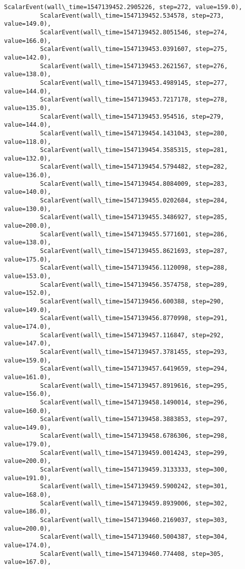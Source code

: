 \documentclass[11pt]{article}
\begin{document}
\begin{Verbatim}[commandchars=\\\{\}]
          ScalarEvent(wall\_time=1547139452.2905226, step=272, value=159.0),
          ScalarEvent(wall\_time=1547139452.534578, step=273, value=149.0),
          ScalarEvent(wall\_time=1547139452.8051546, step=274, value=166.0),
          ScalarEvent(wall\_time=1547139453.0391607, step=275, value=142.0),
          ScalarEvent(wall\_time=1547139453.2621567, step=276, value=138.0),
          ScalarEvent(wall\_time=1547139453.4989145, step=277, value=144.0),
          ScalarEvent(wall\_time=1547139453.7217178, step=278, value=135.0),
          ScalarEvent(wall\_time=1547139453.954516, step=279, value=144.0),
          ScalarEvent(wall\_time=1547139454.1431043, step=280, value=118.0),
          ScalarEvent(wall\_time=1547139454.3585315, step=281, value=132.0),
          ScalarEvent(wall\_time=1547139454.5794482, step=282, value=136.0),
          ScalarEvent(wall\_time=1547139454.8084009, step=283, value=140.0),
          ScalarEvent(wall\_time=1547139455.0202684, step=284, value=130.0),
          ScalarEvent(wall\_time=1547139455.3486927, step=285, value=200.0),
          ScalarEvent(wall\_time=1547139455.5771601, step=286, value=138.0),
          ScalarEvent(wall\_time=1547139455.8621693, step=287, value=175.0),
          ScalarEvent(wall\_time=1547139456.1120098, step=288, value=153.0),
          ScalarEvent(wall\_time=1547139456.3574758, step=289, value=152.0),
          ScalarEvent(wall\_time=1547139456.600388, step=290, value=149.0),
          ScalarEvent(wall\_time=1547139456.8770998, step=291, value=174.0),
          ScalarEvent(wall\_time=1547139457.116847, step=292, value=147.0),
          ScalarEvent(wall\_time=1547139457.3781455, step=293, value=159.0),
          ScalarEvent(wall\_time=1547139457.6419659, step=294, value=161.0),
          ScalarEvent(wall\_time=1547139457.8919616, step=295, value=156.0),
          ScalarEvent(wall\_time=1547139458.1490014, step=296, value=160.0),
          ScalarEvent(wall\_time=1547139458.3883853, step=297, value=149.0),
          ScalarEvent(wall\_time=1547139458.6786306, step=298, value=179.0),
          ScalarEvent(wall\_time=1547139459.0014243, step=299, value=200.0),
          ScalarEvent(wall\_time=1547139459.3133333, step=300, value=191.0),
          ScalarEvent(wall\_time=1547139459.5900242, step=301, value=168.0),
          ScalarEvent(wall\_time=1547139459.8939006, step=302, value=186.0),
          ScalarEvent(wall\_time=1547139460.2169037, step=303, value=200.0),
          ScalarEvent(wall\_time=1547139460.5004387, step=304, value=174.0),
          ScalarEvent(wall\_time=1547139460.774408, step=305, value=167.0),

\end{Verbatim}
\end{document}
